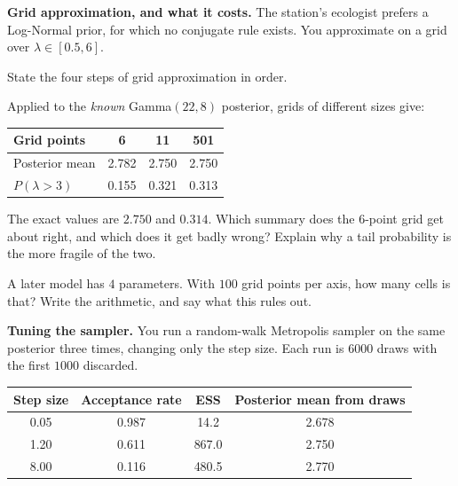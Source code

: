 \documentclass[11pt]{article}
\newcommand{\answerspace}[1]{\vspace{#1}}
\begin{document}
\begin{questions}

\item \textbf{Grid approximation, and what it costs.} The station's ecologist prefers a Log-Normal
prior, for which no conjugate rule exists. You approximate on a grid over $\lambda \in [0.5, 6]$.

\begin{parts}
\item State the four steps of grid approximation in order.
\answerspace{4em}

\item Applied to the \emph{known} Gamma$(22,8)$ posterior, grids of different sizes give:

\begin{center}
\renewcommand{\arraystretch}{1.2}
\begin{tabular}{lccc}
\toprule
\textbf{Grid points} & 6 & 11 & 501 \\
\midrule
Posterior mean & 2.782 & 2.750 & 2.750 \\
$P(\lambda > 3)$ & 0.155 & 0.321 & 0.313 \\
\bottomrule
\end{tabular}
\end{center}

The exact values are $2.750$ and $0.314$. Which summary does the 6-point grid get about right, and
which does it get badly wrong? Explain why a tail probability is the more fragile of the two.
\answerspace{4.5em}

\item A later model has $4$ parameters. With $100$ grid points per axis, how many cells is that?
Write the arithmetic, and say what this rules out.
\answerspace{4em}
\end{parts}

\item \textbf{Tuning the sampler.} You run a random-walk Metropolis sampler on the same posterior
three times, changing only the step size. Each run is $6000$ draws with the first $1000$ discarded.

\begin{center}
\renewcommand{\arraystretch}{1.25}
\begin{tabular}{cccc}
\toprule
\textbf{Step size} & \textbf{Acceptance rate} & \textbf{ESS} & \textbf{Posterior mean from draws} \\
\midrule
0.05 & 0.987 & 14.2 & 2.678 \\
1.20 & 0.611 & 867.0 & 2.750 \\
8.00 & 0.116 & 480.5 & 2.770 \\
\bottomrule
\end{tabular}
\end{center}


\end{questions}
\end{document}
